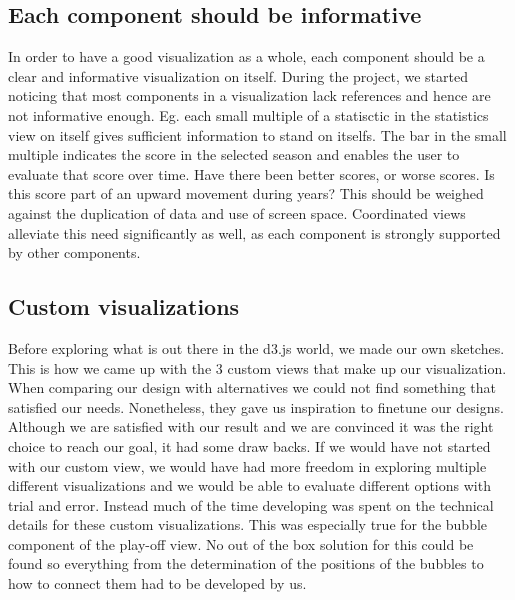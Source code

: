 \documentclass[chi_draft]{sigchi}
\begin{document}

\subsection{Each component should be informative}
In order to have a good visualization as a whole, each component should be a
clear and informative visualization on itself. During the project, we started noticing that most components in a visualization lack references and hence are not informative enough. Eg. each small multiple of a statisctic in the statistics view on itself gives sufficient information to stand on itselfs. The bar in the small multiple indicates the score in the selected season and enables the user to evaluate that score over time. Have there been better scores, or worse scores. Is this score
part of an upward movement during years? This should be weighed against the
duplication of data and use of screen space. Coordinated views alleviate this
need significantly as well, as each component is strongly supported by other
components.

\subsection{Custom visualizations}
Before exploring what is out there in the d3.js world, we made our own sketches.
This is how we came up with the 3 custom views that make up our visualization.
When comparing our design with alternatives we could not find something that
satisfied our needs. Nonetheless, they gave us inspiration to finetune our
designs. Although we are satisfied with our result and we are convinced it was
the right choice to reach our goal, it had some draw backs. If we would have not started with our custom view, we would have had more freedom in exploring multiple different visualizations and we would be able to evaluate different options with trial and error. Instead much of the time developing was spent on the technical details for these custom visualizations. This was especially true for the bubble component of the play-off view. No out of the box solution for this could be found so everything from the determination of the positions of the bubbles to how to connect them had to be developed by us.
\end{document}
